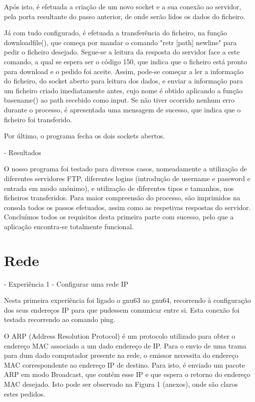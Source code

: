 \documentclass[article, a4paper, 11pt, oneside]{memoir}
\begin{document}
Após isto, é efetuada a criação de um novo socket e a sua conexão ao servidor, pela porta resultante do passo anterior, de onde serão lidos os dados do ficheiro.

Já com tudo configurado, é efetuada a transferência do ficheiro, na função download\textunderscore file(), que começa por mandar
o comando "retr [path] newline" para pedir o ficheiro desejado. Segue-se a leitura da resposta do servidor face a este comando,
a qual se espera ser o código 150, que indica que o ficheiro está pronto para download e o pedido foi aceite. 
Assim, pode-se começar a ler a informação do ficheiro, do socket aberto para leitura dos dados, e enviar a informação para um ficheiro criado imediatamente antes,
cujo nome é obtido aplicando a função basename() ao path recebido como input. Se não tiver ocorrido nenhum erro durante o processo, é apresentada uma mensagem de sucesso,
que indica que o ficheiro foi transferido. 

Por último, o programa fecha os dois sockets abertos.

- Resultados

O nosso programa foi testado para diversos casos, nomeadamente a utilização de diferentes servidores FTP,
diferentes logins (introdução de username e password e entrada em modo anónimo), e utilização de diferentes tipos e tamanhos, nos ficheiros transferidos.
Para maior compreensão do processo, são imprimidos na consola todos os passos efetuados, assim como as respetivas respostas do servidor.
Concluímos todos os requisitos desta primeira parte com sucesso, pelo que a aplicação encontra-se totalmente funcional.

\chapter[Rede][Rede]{Rede} \label{\thechapter}

- Experiência 1 - Configurar uma rede IP

Nesta primeira experiência foi ligado o gnu63 ao gnu64, recorrendo à configuração dos seus endereços IP para que pudessem comunicar entre si. Esta conexão foi testada recorrendo ao comando ping.

O ARP (Address Resolution Protocol) é um protocolo utilizado para obter o endereço MAC associado
a um dado endereço de IP. Para o envio de uma trama para dum dado computador presente na rede, o emissor
necessita do endereço MAC correspondente ao endereço IP de destino. Para isto, é enviado um pacote ARP
em modo Broadcast, que contém esse IP e que espera o retorno do endereço MAC desejado.
Isto pode ser observado na Figura 1 (anexos), onde são claros estes pedidos.
\end{document}
